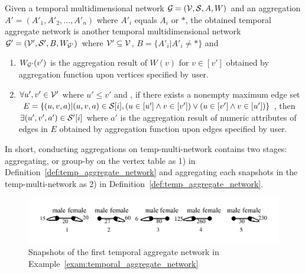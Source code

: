 \documentclass[10pt,journal,compsoc]{IEEEtran}
\begin{document}
\begin{definition}
	\label{def:temp_aggregate_network}
	Given a temporal multidimensional network $\mathcal{G}=(\mathcal{V},\mathcal{S},A,W)$ and an aggregation $A'=(A'_1,A'_2,...,A'_n)$ where $A'_i$ equals $A_i$ or $\ast$, the obtained temporal aggregate network is another temporal multidimensional network $\mathcal{G}'=(\mathcal{V}',\mathcal{S}',B,W_{\mathcal{G}'})$ where $\mathcal{V}' \subseteq \mathcal{V}$, $B=\{A'_i|A'_i \neq \ast\}$ and
	\begin{enumerate}
		\item {} $W_{\mathcal{G}'}(v')$ is the aggregation result of $W(v)$ for $v \in [v']$ obtained by aggregation function upon vertices specified by user.
		\item $\forall u',v' \in \mathcal{V}'$ where $u' \leq v'$ and , if there exists a nonempty maximum edge set $E=\{(u,v,a)|(u,v,a) \in \mathcal{S}[i],(u \in [u'] \wedge v \in [v']) \vee (u \in [v'] \wedge v \in [u']) \}$, then $ \exists (u',v',a') \in \mathcal{S}'[i] $ where $a'$ is the aggregation result of numeric attributes of edges in $E$ obtained by aggregation function upon edges specified by user.
	\end{enumerate}
\end{definition}
In short, conducting aggregations on temp-multi-network contains two stages: aggregating, or group-by on the vertex table as 1) in Definition~\ref{def:temp_aggregate_network} and aggregating each snapshots in the temp-multi-network as 2) in Definition~\ref{def:temp_aggregate_network}.

\begin{figure}[t!]
	\begin{center}
		\includegraphics[width=0.95\columnwidth]{fig/example/exam_aggregate_gender.pdf}
	\end{center}
	\vspace*{-0.9cm}
	\caption{Snapshots of the first temporal aggregate network in Example~\ref{exam:temporal_aggregate_network}}
	\vspace*{-0.4cm}
	\label{fig:aggregation_gender}
\end{figure}
\end{document}
